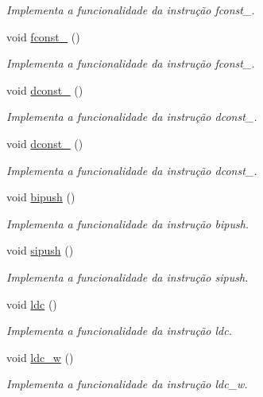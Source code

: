 \begin{DoxyCompactItemize}
\begin{DoxyCompactList}\small\item\em Implementa a funcionalidade da instrução fconst\+\_. \end{DoxyCompactList}\item 
void \hyperlink{classOperations_a1857c1a0e34d6f91dcb7166ca6d678a2}{fconst\+\_} ()
\begin{DoxyCompactList}\small\item\em Implementa a funcionalidade da instrução fconst\+\_. \end{DoxyCompactList}\item 
void \hyperlink{classOperations_abd7f711342c43f7fa4e93b41931e6c86}{dconst\+\_} ()
\begin{DoxyCompactList}\small\item\em Implementa a funcionalidade da instrução dconst\+\_. \end{DoxyCompactList}\item 
void \hyperlink{classOperations_a1a704891f81e3b532bf0eaad94429773}{dconst\+\_} ()
\begin{DoxyCompactList}\small\item\em Implementa a funcionalidade da instrução dconst\+\_. \end{DoxyCompactList}\item 
void \hyperlink{classOperations_a981b0f43cbe76b4fe7e2122c482d4a5b}{bipush} ()
\begin{DoxyCompactList}\small\item\em Implementa a funcionalidade da instrução bipush. \end{DoxyCompactList}\item 
void \hyperlink{classOperations_aed3838c73d7febfcacab9f101e6946ad}{sipush} ()
\begin{DoxyCompactList}\small\item\em Implementa a funcionalidade da instrução sipush. \end{DoxyCompactList}\item 
void \hyperlink{classOperations_aa9a87c1ef4605d0b7b7a99c8d9bc693c}{ldc} ()
\begin{DoxyCompactList}\small\item\em Implementa a funcionalidade da instrução ldc. \end{DoxyCompactList}\item 
void \hyperlink{classOperations_a081fd22827f77e8ce5219275256cc831}{ldc\+\_\+w} ()
\begin{DoxyCompactList}\small\item\em Implementa a funcionalidade da instrução ldc\+\_\+w. \end{DoxyCompactList}\item 

\end{DoxyCompactItemize}
